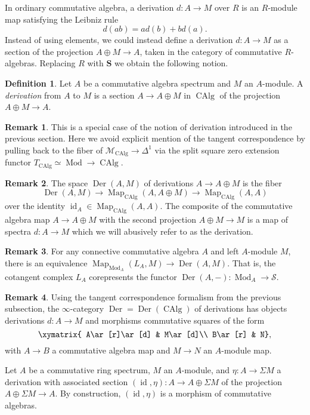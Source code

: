 \documentclass{article}
\theoremstyle{definition}
\newtheorem{definition}{Definition}[subsection]
\newtheorem{remark}{Remark}[subsection]
\newcommand{\M}{\mathcal{M}}
\renewcommand{\S}{\mathcal{S}}
\renewcommand{\SS}{\mathbf{S}}
\newcommand{\too}{\longrightarrow}
\DeclareMathOperator{\Mod}{Mod}
\DeclareMathOperator{\CAlg}{CAlg}
\DeclareMathOperator{\Der}{Der}
\DeclareMathOperator{\id}{id}
\DeclareMathOperator{\Map}{Map}
\begin{document}
In ordinary commutative algebra, a derivation $d:A\to M$ over $R$ is an $R$-module map satisfying the Leibniz rule
\[
d(ab)=ad(b)+bd(a).
\]
Instead of using elements, we could instead define a derivation $d:A\to M$ as a section of the projection $A\oplus M\to A$, taken in the category of commutative $R$-algebras.
Replacing $R$ with $\SS$ we obtain the following notion.
\begin{definition}
Let $A$ be a commutative algebra spectrum and $M$ an $A$-module.
A {\em derivation} from $A$ to $M$ is a section $A\to A\oplus M$ in $\CAlg$ of the projection $A\oplus M\to A$.
\end{definition}
\begin{remark}
This is a special case of the notion of derivation introduced in the previous section.
Here we avoid explicit mention of the tangent correspondence by pulling back to the fiber of $\M_{\CAlg}\to\Delta^1$ via the split square zero extension functor $T_{\CAlg}\simeq\Mod\to\CAlg$.
\end{remark}
\begin{remark}
The space $\Der(A,M)$
\index{$\Der(A,M)$}
of derivations $A\to A\oplus M$ is the fiber
\[
\Der(A,M)\too\Map_{\CAlg}(A,A\oplus M)\too\Map_{\CAlg}(A,A)
\]
over the identity $\id_A\in\Map_{\CAlg}(A,A)$.
The composite of the commutative algebra map $A\to A\oplus M$ with the second projection $A\oplus M\to M$ is a map of spectra $d:A\to M$ which we will abusively refer to as the derivation.
\end{remark}
\begin{remark}
For any connective commutative algebra $A$ and left $A$-module $M$, there is an equivalence
$
\Map_{\Mod_A}(L_{A},M)\to\Der(A,M).
$
That is, the cotangent complex $L_A$ corepresents the functor $\Der(A,-):\Mod_A\to\S$.
\end{remark}

\begin{remark}
Using the tangent correspondence formalism from the previous subsection, the $\infty$-category $\Der=\Der(\CAlg)$
\index{$\Der$}
of derivations has objects derivations $d:A\to M$ and morphisms commutative squares of the form
\[
\xymatrix{
A\ar[r]\ar[d] & M\ar[d]\\
B\ar[r] & N},
\]
with $A\to B$ a commutative algebra map and $M\to N$ an $A$-module map.
\end{remark}


Let $A$ be a commutative ring spectrum, $M$ an $A$-module, and $\eta:A\to\Sigma M$ a derivation with associated section $(\id,\eta):A\to A\oplus\Sigma M$ of the projection $A\oplus\Sigma M\to A$.
By construction, $(\id,\eta)$ is a morphism of commutative algebras.
\end{document}
